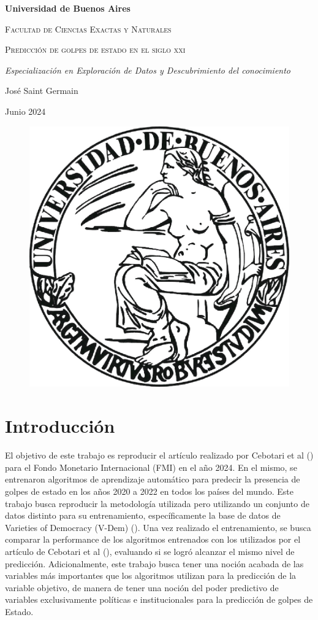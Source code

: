 \documentclass{article}
\begin{document}
\begin{titlepage}
  \centering
  {\bfseries\LARGE Universidad de Buenos Aires \par}
  \vspace{1cm}
  {\scshape\Large Facultad de Ciencias Exactas y Naturales \par}
  \vspace{3cm}
  {\scshape\Huge Predicción de golpes de estado en el siglo xxi \par}
  \vspace{3cm}
  {\itshape\Large Especializaci\'on en Exploraci\'on de Datos y Descubrimiento del conocimiento \par}
  \vfill
  {\Large José Saint Germain \par}
  \vfill
  {\Large Junio 2024 \par}

  \begin{figure}[H]
    \centering 
    \includegraphics[width=.5\textwidth]{0_portada.jpg}
   \end{figure}
\end{titlepage}



\pagebreak
\tableofcontents
\pagebreak

\section{Introducción}
El objetivo de este trabajo es reproducir el artículo realizado por Cebotari et al 
(\cite{Ceb24}) para el Fondo Monetario Internacional (FMI) en el año 2024. En el mismo,
se entrenaron algoritmos de aprendizaje automático para predecir la presencia de golpes
de estado en los años 2020 a 2022 en todos los países del mundo. Este trabajo busca
reproducir la metodología utilizada pero utilizando un conjunto de datos distinto para su
entrenamiento, específicamente la base de datos de Varieties of Democracy (V-Dem) 
(\cite{Cop24}). Una vez realizado el entrenamiento, se 
busca comparar la performance de los algoritmos entrenados con los utilizados por el artículo
de Cebotari et al (\cite{Ceb24}), evaluando si se logró alcanzar el mismo nivel de predicción. 
Adicionalmente, este trabajo busca tener una noción acabada de las variables más importantes 
que los algoritmos utilizan para la predicción de la variable objetivo, de manera de tener
una noción del poder predictivo de variables exclusivamente políticas e institucionales para 
la predicción de golpes de Estado.
\end{document}
